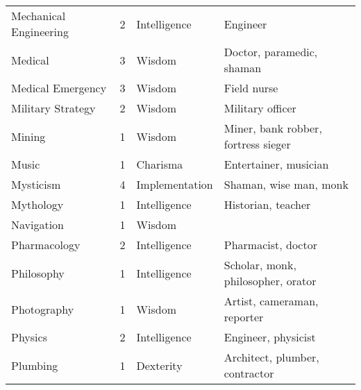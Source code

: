 \documentclass[twoside]{book}
\begin{document}
\begin{longtable}{p{1.25in}llp{12em}}
  \tabularnewline
      
  \raggedright
           Mechanical Engineering 
  &
   2 
  &
   Intelligence 
  &
   Engineer 
  \tabularnewline
      
  \raggedright
           Medical 
  &
   3 
  &
   Wisdom 
  &
   Doctor, paramedic, shaman
           
  \tabularnewline
      
  \raggedright
           Medical Emergency 
  &
   3 
  &
   Wisdom 
  &
   Field nurse 
  \tabularnewline
      
  \raggedright
           Military Strategy 
  &
   2 
  &
   Wisdom 
  &
   Military officer 
  \tabularnewline
      
  \raggedright
           Mining 
  &
   1 
  &
   Wisdom 
  &
   Miner, bank robber,
           fortress sieger 
  \tabularnewline
      
  \raggedright
           Music 
  &
   1 
  &
   Charisma 
  &
   Entertainer, musician
           
  \tabularnewline
      
  \raggedright
           Mysticism 
  &
   4 
  &
   Implementation 
  &
   Shaman, wise man, monk
           
  \tabularnewline
      
  \raggedright
           Mythology 
  &
   1 
  &
   Intelligence 
  &
   Historian, teacher
           
  \tabularnewline
      
  \raggedright
           Navigation 
  &
   1 
  &
   Wisdom 
  \tabularnewline
      
  \raggedright
           Pharmacology 
  &
   2 
  &
   Intelligence 
  &
   Pharmacist, doctor
           
  \tabularnewline
      
  \raggedright
           Philosophy 
  &
   1 
  &
   Intelligence 
  &
   Scholar, monk,
           philosopher, orator 
  \tabularnewline
      
  \raggedright
           Photography 
  &
   1 
  &
   Wisdom 
  &
   Artist, cameraman,
           reporter 
  \tabularnewline
      
  \raggedright
           Physics 
  &
   2 
  &
   Intelligence 
  &
   Engineer, physicist
           
  \tabularnewline
      
  \raggedright
           Plumbing 
  &
   1 
  &
   Dexterity 
  &
   Architect, plumber,
           contractor 
  \tabularnewline
      

\end{longtable}
\end{document}
